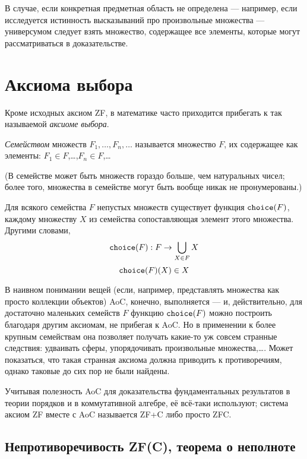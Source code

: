 В случае, если конкретная предметная область не определена --- например, если
исследуется истинность высказываний про произвольные множества --- универсумом
следует взять множество, содержащее все элементы, которые могут рассматриваться
в доказательстве.

\section{Аксиома выбора}

Кроме исходных аксиом ZF, в математике часто приходится прибегать к так
называемой \textit{аксиоме выбора}.

\begin{defn}
  \textit{Семейством} множеств $F_1,\ldots,F_n,\ldots$ называется множество $F$,
  их содержащее как элементы: $F_1\in F$,\dots,$F_n\in F$,\dots
\end{defn}

(В семействе может быть множеств гораздо больше, чем натуральных чисел; более
того, множества в семействе могут быть вообще никак не пронумерованы.)

\begin{ax}
  Для всякого семейства $F$ непустых множеств существует функция
  $\verb|choice|(F)$, каждому множеству $X$ из семейства сопоставляющая элемент
  этого множества. Другими словами,
  \[\verb|choice|(F) : F \to \bigcup_{X\in F} X\]
  \[\verb|choice|(F)(X) \in X\]
\end{ax}

В наивном понимании вещей (если, например, представлять множества как просто
коллекции объектов) AoC, конечно, выполняется --- и, действительно, для
достаточно маленьких семейств $F$ функцию $\verb|choice|(F)$ можно построить
благодаря другим аксиомам, не прибегая к AoC. Но в применении к более крупным
семействам она позволяет получать какие-то уж совсем странные следствия:
удваивать сферы, упорядочивать произвольные множества,\dots. Может показаться,
что такая странная аксиома должна приводить к противоречиям, однако таковые до
сих пор не были найдены.

Учитывая полезность AoC для доказательства фундаментальных результатов в теории
порядков и в коммутативной алгебре, её всё-таки используют; система аксиом ZF
вместе с AoC называется ZF+C либо просто ZFC.

\subsection{Непротиворечивость ZF(C), теорема о неполноте}


